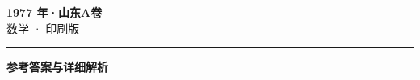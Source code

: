 \documentclass[zihao=5, a4paper]{ctexart}
\begin{document}
\begin{center}
  {\Large\bfseries 1977 年·山东A卷}\\[4pt]
  {\large 数学 · 印刷版}
\end{center}
\medskip
{}

\par\bigskip\hrule\bigskip
{}
\begin{center}{\large\bfseries 参考答案与详细解析}\end{center}
\smallskip

\end{document}
